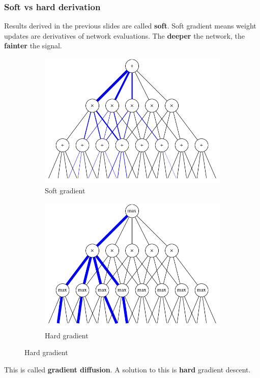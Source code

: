 \documentclass[usenames,dvipsnames]{beamer}
\begin{document}
\begin{frame}
  \frametitle{Soft vs hard derivation}

  Results derived in the previous slides are called \textbf{soft}. Soft gradient means weight
  updates are derivatives of network evaluations. The \textbf{deeper} the network, the
  \textbf{fainter} the signal.

  \begin{figure}[h]
    \centering
    \begin{subfigure}[b]{0.45\linewidth}
      \centering\includegraphics[width=\textwidth]{imgs/softgrad.png}
      \captionsetup{justification=centering}
      \caption{Soft gradient}
    \end{subfigure}
    \begin{subfigure}[b]{0.45\linewidth}
      \centering\includegraphics[width=\textwidth]{imgs/hardgrad.png}
      \captionsetup{justification=centering}
      \caption{Hard gradient}
    \end{subfigure}
  \end{figure}

  This is called \textbf{gradient diffusion}. A solution to this is \textbf{hard} gradient descent.
\end{frame}
\end{document}
